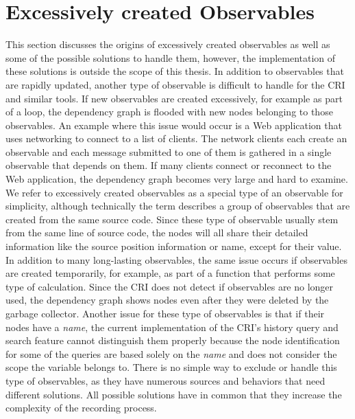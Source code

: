 \section{Excessively created Observables}
\label{sec:DynamicallyCreated}
This section discusses the origins of excessively created observables as well as some of the possible solutions to handle them, however, the implementation of these solutions is outside the scope of this thesis.
In addition to observables that are rapidly updated, another type of observable is difficult to handle for the CRI and similar tools. If new observables are created excessively, for example as part of a loop, the dependency graph is flooded with new nodes belonging to those observables. An example where this issue would occur is a Web application that uses networking to connect to a list of clients. The network clients each create an observable and each message submitted to one of them is gathered in a single observable that depends on them. If many clients connect or reconnect to the Web application, the dependency graph becomes very large and hard to examine. We refer to excessively created observables as a special type of an observable for simplicity, although technically the term describes a group of observables that are created from the same source code. Since these type of observable usually stem from the same line of source code, the nodes will all share their detailed information like the source position information or name, except for their value. In addition to many long-lasting observables, the same issue occurs if observables are created temporarily, for example, as part of a function that performs some type of calculation. Since the CRI does not detect if observables are no longer used, the dependency graph shows nodes even after they were deleted by the garbage collector. Another issue for these type of observables is that if their nodes have a \emph{name}, the current implementation of the CRI's history query and search feature cannot distinguish them properly because the node identification for some of the queries are based solely on the \emph{name} and does not consider the scope the variable belongs to.
There is no simple way to exclude or handle this type of observables, as they have numerous sources and behaviors that need different solutions. All possible solutions have in common that they increase the complexity of the recording process.

